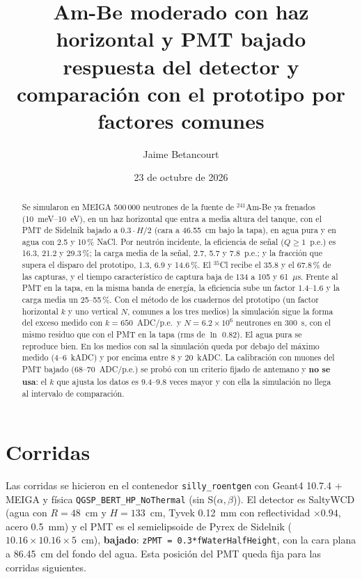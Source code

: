 \documentclass[11pt,a4paper]{article}
\title{Am-Be moderado con haz horizontal y PMT bajado\\
\large respuesta del detector y comparación con el prototipo por factores comunes}
\author{Jaime Betancourt}
\date{23 de octubre de 2026}
\begin{document}
\maketitle

\begin{abstract}
Se simularon en MEIGA 500\,000 neutrones de la fuente de $^{241}$Am-Be ya frenados (10~meV--10~eV), en un haz
horizontal que entra a media altura del tanque, con el PMT de Sidelnik bajado a $0.3\cdot H/2$ (cara a 46.55~cm
bajo la tapa), en agua pura y en agua con 2.5 y 10\,\% NaCl. Por neutrón incidente, la eficiencia de señal
($Q\geq1$~p.e.) es 16.3, 21.2 y 29.3\,\%; la carga media de la señal, 2.7, 5.7 y 7.8~p.e.; y la fracción que
supera el disparo del prototipo, 1.3, 6.9 y 14.6\,\%. El $^{35}$Cl recibe el 35.8 y el 67.8\,\% de las capturas,
y el tiempo característico de captura baja de 134 a 105 y 61~$\mu$s. Frente al PMT en la tapa, en la misma banda
de energía, la eficiencia sube un factor 1.4--1.6 y la carga media un 25--55\,\%.
Con el método de los cuadernos del prototipo (un factor horizontal $k$ y uno vertical $N$, comunes a los tres
medios) la simulación sigue la forma del exceso medido con $k=650$~ADC/p.e.\ y $N=6.2\times10^6$ neutrones en
300~s, con el mismo residuo que con el PMT en la tapa (rms de $\ln$ 0.82). El agua pura se reproduce bien. En los
medios con sal la simulación queda por debajo del máximo medido (4--6~kADC) y por encima entre 8 y 20~kADC.
La calibración con muones del PMT bajado (68--70~ADC/p.e.) se probó con un criterio fijado de antemano y
\textbf{no se usa}: el $k$ que ajusta los datos es 9.4--9.8 veces mayor y con ella la simulación no llega al
intervalo de comparación.
\end{abstract}
\tableofcontents

\section{Corridas}
Las corridas se hicieron en el contenedor \texttt{silly\_roentgen} con Geant4 10.7.4 + MEIGA y física
\texttt{QGSP\_BERT\_HP\_\allowbreak NoThermal} (sin S($\alpha,\beta$)). El detector es SaltyWCD (agua con $R=48$~cm
y $H=133$~cm, Tyvek 0.12~mm con reflectividad $\times0.94$, acero 0.5~mm) y el PMT es el semielipsoide de Pyrex de
Sidelnik ($10.16\times10.16\times5$~cm), \textbf{bajado}: \texttt{zPMT = 0.3*fWaterHalfHeight}, con la cara plana a
86.45~cm del fondo del agua. Esta posición del PMT queda fija para las corridas siguientes.
\end{document}
